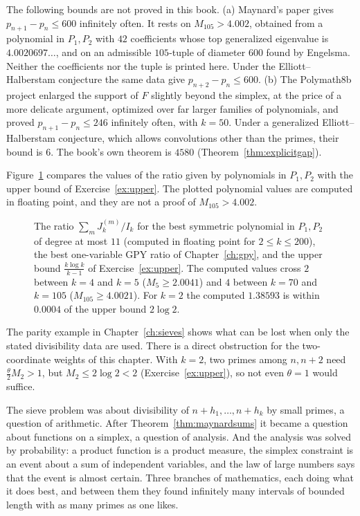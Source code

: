 \begin{remark}
The following bounds are not proved in this book. (a) Maynard's paper gives $p_{n+1}-p_n\le600$ infinitely often. It rests on $M_{105}>4.002$, obtained from a polynomial in $P_1,P_2$ with $42$ coefficients whose top generalized eigenvalue is $4.0020697\ldots$, and on an admissible $105$-tuple of diameter $600$ found by Engelsma. Neither the coefficients nor the tuple is printed here. Under the Elliott--Halberstam conjecture the same data give $p_{n+2}-p_n\le600$. (b) The Polymath8b project enlarged the support of $F$ slightly beyond the simplex, at the price of a more delicate argument, optimized over far larger families of polynomials, and proved $p_{n+1}-p_n\le246$ infinitely often, with $k=50$. Under a generalized Elliott--Halberstam conjecture, which allows convolutions other than the primes, their bound is $6$. The book's own theorem is $4580$ (Theorem~\ref{thm:explicitgap}).
\end{remark}

Figure~\ref{fig:mk} compares the values of the ratio given by polynomials in $P_1,P_2$ with the upper bound of Exercise~\ref{ex:upper}. The plotted polynomial values are computed in floating point, and they are not a proof of $M_{105}>4.002$.

\begin{figure}[ht]
\centering
{}
\caption{The ratio $\sum_mJ_k^{(m)}/I_k$ for the best symmetric polynomial in $P_1,P_2$ of degree at most $11$ (computed in floating point for $2\le k\le200$), the best one-variable GPY ratio of Chapter~\ref{ch:gpy}, and the upper bound $\frac{k\log k}{k-1}$ of Exercise~\ref{ex:upper}. The computed values cross $2$ between $k=4$ and $k=5$ ($M_5\ge2.0041$) and $4$ between $k=70$ and $k=105$ ($M_{105}\ge4.0021$). For $k=2$ the computed $1.38593$ is within $0.0004$ of the upper bound $2\log2$.}
\label{fig:mk}
\end{figure}

The parity example in Chapter~\ref{ch:sieves} shows what can be lost when only the stated divisibility data are used. There is a direct obstruction for the two-coordinate weights of this chapter. With $k=2$, two primes among $n,n+2$ need $\frac\theta2M_2>1$, but $M_2\le2\log2<2$ (Exercise~\ref{ex:upper}), so not even $\theta=1$ would suffice.

\begin{beauty}
The sieve problem was about divisibility of $n+h_1,\dots,n+h_k$ by small primes, a question of arithmetic. After Theorem~\ref{thm:maynardsums} it became a question about functions on a simplex, a question of analysis. And the analysis was solved by probability: a product function is a product measure, the simplex constraint is an event about a sum of independent variables, and the law of large numbers says that the event is almost certain. Three branches of mathematics, each doing what it does best, and between them they found infinitely many intervals of bounded length with as many primes as one likes.
\end{beauty}


